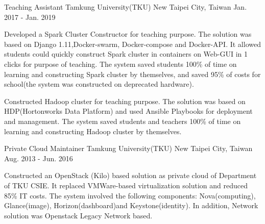 \begin{cventries}
    \cventry
        {Teaching Assistant}
        {Tamkung University(TKU)}
        {New Taipei City, Taiwan}
        {Jan. 2017 - Jan. 2019}
        {
            \begin{cvitems}
                \item
                    {
                        Developed a Spark Cluster Constructor for teaching purpose. The solution was based on Django 1.11,Docker-swarm, Docker-compose and Docker-API. It allowed students could quickly construct Spark cluster in containers on Web-GUI in 1 clicks for purpose of teaching. The system saved students 100\% of time on learning and constructing Spark cluster by themselves, and saved 95\% of costs for school(the system was constructed on deprecated hardware).
                    }
                \item
                    {
                        Constructed Hadoop cluster for teaching purpose. The solution was based on HDP(Hortonworks Data Platform) and used Ansible Playbooks for deployment and management. The system saved students and teachers 100\% of time on learning and constructing Hadoop cluster by themselves.
                    }
            \end{cvitems}
        }
        
    \cventry
        {Private Cloud Maintainer}
        {Tamkung University(TKU)}
        {New Taipei City, Taiwan}
        {Aug. 2013 - Jun. 2016}
        {
            \begin{cvitems}
                \item
                    {
                        Constructed an OpenStack (Kilo) based solution as private cloud of Department of TKU CSIE. It replaced VMWare-based virtualization solution and reduced 85\% IT costs. The system involved the following components: Nova(computing), Glance(image), Horizon(dashboard)and Keystone(identity). In addition, Network solution was Openstack Legacy Network based. 
                    }
            \end{cvitems}
        }

\end{cventries}
